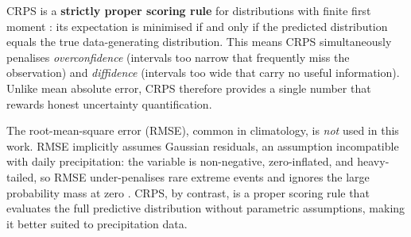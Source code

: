 CRPS is a \textbf{strictly proper scoring rule} for distributions with
finite first moment \cite{gneiting2007strictly}: its expectation is
minimised if and only if the predicted distribution equals the true
data-generating distribution.  This
means CRPS simultaneously penalises \emph{overconfidence} (intervals too narrow
that frequently miss the observation) and \emph{diffidence} (intervals too wide
that carry no useful information).  Unlike mean absolute error, CRPS therefore
provides a single number that rewards honest uncertainty quantification.

The root-mean-square error (RMSE), common in climatology, is \emph{not} used
in this work.  RMSE implicitly assumes Gaussian residuals, an assumption incompatible
with daily precipitation: the variable is non-negative, zero-inflated, and
heavy-tailed, so RMSE under-penalises rare extreme events and ignores the
large probability mass at zero \cite{hunt2025stop}.  CRPS, by contrast,
is a proper scoring rule that evaluates the full predictive distribution
without parametric assumptions, making it better suited to precipitation data.

